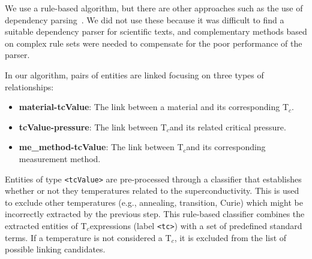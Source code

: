 \documentclass[]{interact}
\theoremstyle{plain}%
\theoremstyle{definition}
\theoremstyle{remark}
\newcommand{\tc}{T$_{c}$}
\begin{document}
We use a rule-based algorithm, but there are other approaches such as the use of dependency parsing~\cite{yoshikawa:2017acl, Tiktinsky2020pyBARTES, swayamdipta:17, zhou-zhao-2019-head}. We did not use these because it was difficult to find a suitable dependency parser for scientific texts, and complementary methods based on complex rule sets were needed to compensate for the poor performance of the parser.

In our algorithm, pairs of entities are linked focusing on three types of relationships:
\begin{itemize}
    \item \textbf{material-tcValue}: The link between a material and its corresponding \tc.
    \item \textbf{tcValue-pressure}: The link between \tc and its related critical pressure.
    \item \textbf{me\_method-tcValue}: The link between \tc and its corresponding measurement method.
\end{itemize}

Entities of type \texttt{<tcValue>} are pre-processed through a classifier that establishes whether or not they temperatures related to the superconductivity. This is used to exclude other temperatures (e.g., annealing, transition, Curie) which might be incorrectly extracted by the previous step.
This rule-based classifier combines the extracted entities of \tc expressions (label \texttt{<tc>}) with a set of predefined standard terms.
If a temperature is not considered a \tc, it is excluded from the list of possible linking candidates.
\end{document}
